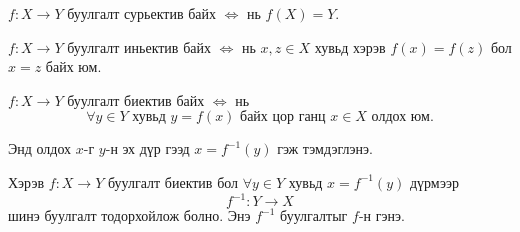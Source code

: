 \begin{theorem}\label{fun:surj}
$f:X\to Y$ буулгалт сурьектив байх $\Longleftrightarrow$ нь $f(X)=Y$.
\end{theorem}
\begin{theorem}\label{fun:inj}
$f:X\to Y$ буулгалт иньектив байх $\Longleftrightarrow$ нь $ x , z\in X$ хувьд хэрэв $f(x)=f(z)$ бол $x=z$ байх юм.
\end{theorem}
\begin{theorem}\label{fun:bij}
$f:X\to Y$ буулгалт биектив байх $\Longleftrightarrow$ нь $$\forall y\in Y \text{ хувьд }   y=f(x) \text{ байх цор ганц } x\in X \text{ олдох юм.}$$ 
\end{theorem}
 Энд олдох $x$-г $y$-н эх дүр гээд $x=f^{-1}(y)$ гэж тэмдэглэнэ. 

\begin{definition}[Урвуу]\label{fun:inv}
Хэрэв $f:X\to Y$ буулгалт биектив бол $\forall y\in Y$ хувьд $x=f^{-1}(y)$ дүрмээр 
\begin{equation}
\label{inverse} f^{-1}:Y\to X
\end{equation} шинэ буулгалт тодорхойлож болно. Энэ  $f^{-1}$ буулгалтыг $f$-н  гэнэ.
\end{definition}

